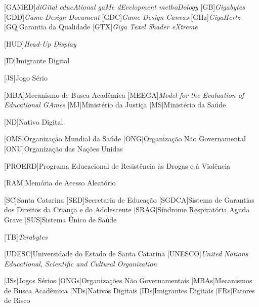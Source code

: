\begin{siglas}
\begin{acronym}[labelsep=1.5cm]
		[GAMED]{\textit{diGital educAtional gaMe dEvelopment methoDology}}
		[GB]{\textit{Gigabytes}}
		[GDD]{\textit{Game Design Document}}
		[GDC]{\textit{Game Design Canvas}}
		[GHz]{\textit{GigaHertz}}
		[GQ]{{Garantia da Qualidade}}
		[GTX]{\textit{Giga Texel Shader eXtreme}}
		
		[HUD]{\textit{Head-Up Display}}

		[ID]{{Imigrante Digital}}

		[JS]{{Jogo Sério}}

		[MBA]{{Mecanismo de Busca Acadêmica}}
		[MEEGA]{\textit{Model for the Evaluation of Educational GAmes}}
		[MJ]{{Ministério da Justiça}}
		[MS]{{Ministério da Saúde}} 
		
		[ND]{{Nativo Digital}}

		[OMS]{{Organização Mundial da Saúde}} 
		[ONG]{{Organização Não Governamental}}
		[ONU]{{Organização das Nações Unidas}}
		
		[PROERD]{{Programa Educacional de Resistência às Drogas e à Violência}}

		[RAM]{{Memória de Acesso Aleatório}}
		
		[SC]{{Santa Catarina}}
		[SED]{{Secretaria de Educação}}
		[SGDCA]{{Sistema de Garantias dos Direitos da Criança e do Adolescente}}
		{{Síndrome Respiratória Aguda Grave}}
		[SUS]{{Sistema Único de Saúde}}
		
		[TB]{\textit{Terabytes}}

		[UDESC]{{Universidade do Estado de Santa Catarina}}
		[UNESCO]{\textit{United Nations Educational, Scientific and Cultural Organization}}
		
		
		[JSs]{Jogos Sérios}
		{Organizações Não Governamentais}
		{{Mecanismos de Busca Acadêmica}}
		[NDs]{{Nativos Digitais}}
		[IDs]{{Imigrantes Digitais}}
		[FRs]{{Fatores de Risco}}

	\end{acronym}
\end{siglas}






